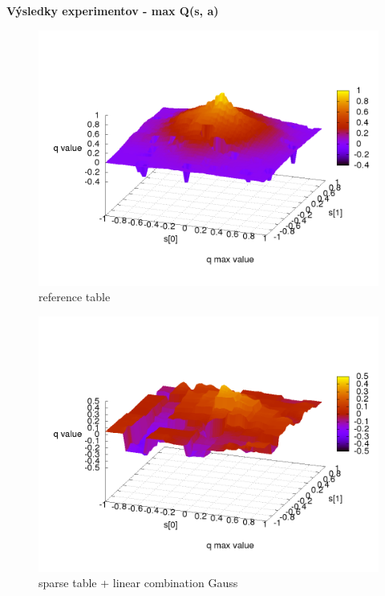 \documentclass[xcolor=dvipsnames]{beamer}
\begin{document}
\begin{frame}{\bf Výsledky experimentov - max Q(s, a)}

\begin{minipage}{.5\textwidth}

\begin{figure}[!htb]
\centering
\includegraphics[scale=.2]{../../results_q_learning/map_1/function_type_0/iterations_10/q_learning_result.png}
\caption{reference table}
\end{figure}

\end{minipage}%
\begin{minipage}{.5\textwidth}

\begin{figure}[!htb]
\centering
\includegraphics[scale=.2]{../../results_q_learning/map_1/function_type_3/iterations_10/q_learning_result.png}
\caption{sparse table + linear combination Gauss}
\end{figure}


\end{minipage}
\end{frame}
\end{document}
